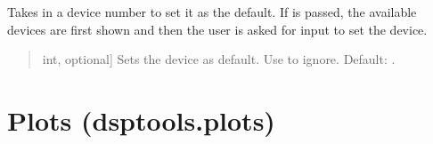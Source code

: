 \documentclass[letterpaper,10pt,english]{sphinxmanual}
\begin{document}

\begin{fulllineitems}
\label{\detokenize{modules/dsptools.measure:dsptools.measure.set_device}}
\pysigstartsignatures
{}
\pysigstopsignatures
\sphinxAtStartPar
Takes in a device number to set it as the default. If  is passed,
the available devices are first shown and then the user is asked for
input to set the device.
\begin{quote}\begin{description}
\begin{description}
\sphinxlineitem{\sphinxstylestrong{device\_number}}{[}int, optional{]}
\sphinxAtStartPar
Sets the device as default. Use  to ignore. Default: .

\end{description}

\end{description}\end{quote}

\end{fulllineitems}


\sphinxstepscope


\section{Plots (dsptools.plots)}
\label{\detokenize{modules/dsptools.plots:module-dsptools.plots}}\label{\detokenize{modules/dsptools.plots:plots-dsptools-plots}}\label{\detokenize{modules/dsptools.plots::doc}}
\end{document}
